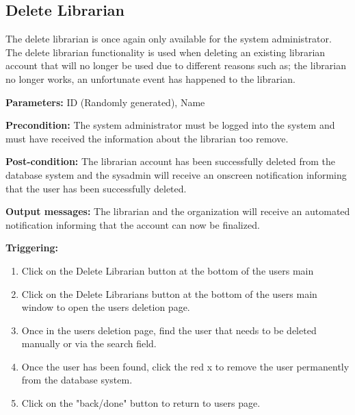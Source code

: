 \subsection{Delete Librarian}

The delete librarian is once again only available for the system administrator. The delete librarian functionality is used when deleting an existing librarian account that will no longer be used due to different reasons such as; the librarian no longer works, an unfortunate event has happened to the librarian.

\begin{description}

\item \textbf{Parameters:} ID (Randomly generated), Name

\item \textbf{Precondition:} The system administrator must be logged into the system and must have received the information about the librarian too remove. 

\item \textbf{Post-condition:} The librarian account has been
successfully deleted from the database system and the sysadmin will receive an
onscreen notification informing that the user has been successfully deleted.

\item \textbf{Output messages:} The librarian and the organization will receive an automated notification informing that the account can now be finalized. 

\item \textbf{Triggering:}
\begin{enumerate}

\item Click on the Delete Librarian button at the bottom of the users main

\item Click on the Delete Librarians button at the bottom of the users main
window to open the users deletion page.

\item Once in the users deletion page, find the user that needs to be deleted manually or via the search field.

\item Once the user has been found, click the red x to remove the user permanently from the database system. 

\item Click on the "back/done" button to return to users page.

\end{enumerate}

\end{description}

